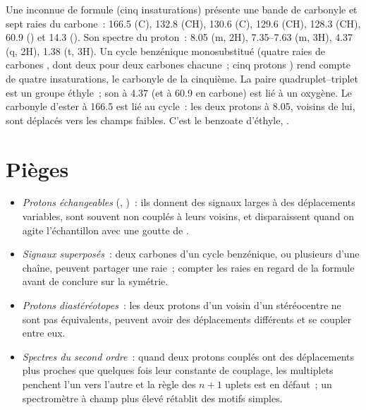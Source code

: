 \begin{example}\label{ex:b2:structure-determination:ester}
Une inconnue de formule  (cinq insaturations) présente une bande de carbonyle et sept raies
du carbone~: 166.5 (C), 132.8 (CH), 130.6 (C), 129.6 (CH), 128.3 (CH), 60.9 () et 14.3
(). Son spectre du proton~: 8.05 (m, 2H), 7.35--7.63 (m, 3H), 4.37 (q, 2H), 1.38 (t, 3H). Un
cycle benzénique monosubstitué (quatre raies de carbones , dont deux pour deux carbones
chacune~; cinq protons ) rend compte de quatre insaturations, le carbonyle de la cinquième. La
paire quadruplet--triplet est un groupe éthyle~; son  à 4.37 (et à 60.9 en carbone) est lié à
un oxygène. Le carbonyle d'ester à 166.5 est lié au cycle~: les deux protons à 8.05, voisins de lui, sont
déplacés vers les champs faibles. C'est le benzoate d'éthyle, .
\end{example}

\section{Pièges}

\begin{itemize}
  \item \emph{Protons échangeables} (, )~: ils donnent des signaux larges à des
        déplacements variables, sont souvent non couplés à leurs voisins, et disparaissent quand on agite
        l'échantillon avec une goutte de .
  \item \emph{Signaux superposés}~: deux carbones d'un cycle benzénique, ou plusieurs  d'une chaîne,
        peuvent partager une raie~; compter les raies en regard de la formule avant de conclure sur la symétrie.
  \item \emph{Protons diastéréotopes}~: les deux protons d'un  voisin d'un stéréocentre ne sont pas
        équivalents, peuvent avoir des déplacements différents et se coupler entre eux.
  \item \emph{Spectres du second ordre}~: quand deux protons couplés ont des déplacements plus proches que
        quelques fois leur constante de couplage, les multiplets penchent l'un vers l'autre et la règle
        des $n+1$ uplets est en défaut~; un spectromètre à champ plus élevé rétablit des motifs simples.
\end{itemize}

